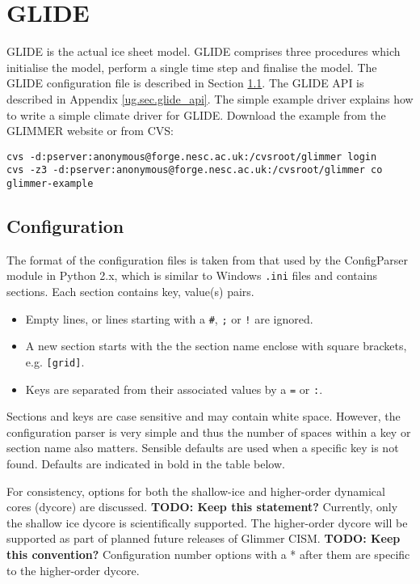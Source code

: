\section{GLIDE}
GLIDE is the actual ice sheet model. GLIDE comprises three procedures which initialise the model, perform a single time step and finalise the model. The GLIDE configuration file is described in Section \ref{ug.sec.config}. The GLIDE API is described in Appendix \ref{ug.sec.glide_api}. The simple example driver explains how to write a simple climate driver for GLIDE. Download the example from the GLIMMER website or from CVS:
\begin{verbatim}
cvs -d:pserver:anonymous@forge.nesc.ac.uk:/cvsroot/glimmer login
cvs -z3 -d:pserver:anonymous@forge.nesc.ac.uk:/cvsroot/glimmer co glimmer-example
\end{verbatim}

\subsection{Configuration}\label{ug.sec.config}
The format of the configuration files is taken from that used by the ConfigParser module in Python 2.x, which is similar to Windows \texttt{.ini} files and contains sections. Each section contains key, value(s) pairs.
\begin{itemize}
\item Empty lines, or lines starting with a \texttt{\#}, \texttt{;} or \texttt{!} are ignored.
\item A new section starts with the the section name enclose with square brackets, e.g. \texttt{[grid]}.
\item Keys are separated from their associated values by a \texttt{=} or \texttt{:}.
\end{itemize}
Sections and keys are case sensitive and may contain white space. However, the configuration parser is very simple and thus the number of spaces within a key or section name also matters. Sensible defaults are used when a specific key is not found.  Defaults are indicated in bold in the table below.

For consistency, options for both the shallow-ice and higher-order dynamical cores (dycore) are discussed. {\bf TODO: Keep this statement?} Currently, only the shallow ice dycore is scientifically supported. The higher-order dycore will be supported as part of planned future releases of Glimmer CISM. {\bf TODO: Keep this convention?} Configuration number options with a * after them are specific to the higher-order dycore.

